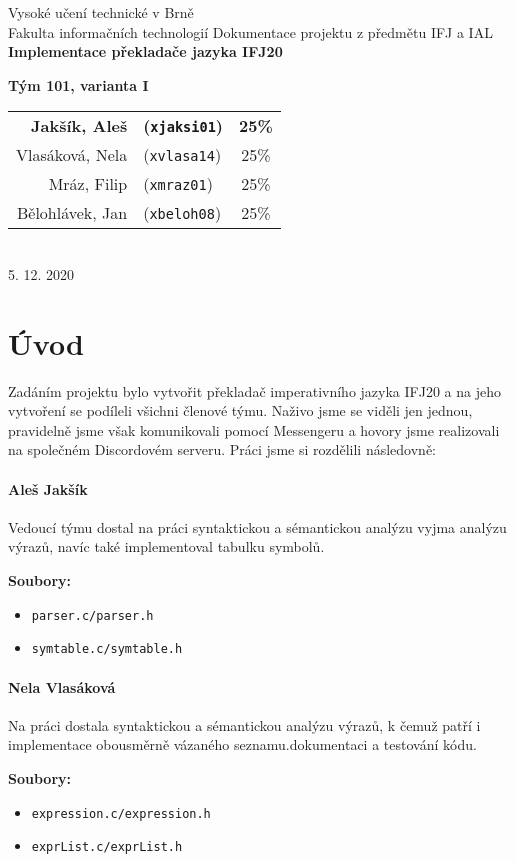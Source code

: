 \documentclass[czech,a4paper,12pt]{article}[]
\begin{document}
\begin{center}
\LARGE{Vysoké učení technické v Brně \\
Fakulta informačních technologií}
\vfill 
\LARGE{Dokumentace projektu z předmětu IFJ a IAL}\\
\Huge{\textbf{Implementace překladače jazyka IFJ20}}\\
\vfill
\large{\textbf{Tým 101, varianta I}\\
\begin{tabular}{ r l c}
\textbf{Jakšík, Aleš} & \textbf{(\texttt{xjaksi01})} & \textbf{25\%} \\ 
Vlasáková, Nela & (\texttt{xvlasa14}) & 25\% \\  
Mráz, Filip & (\texttt{xmraz01}) & 25\% \\
Bělohlávek, Jan & (\texttt{xbeloh08}) & 25\% 
\end{tabular}
}\\[3em]
5. 12. 2020
\end{center}

\newpage

\tableofcontents

\newpage

\section{Úvod}
Zadáním projektu bylo vytvořit překladač imperativního jazyka IFJ20 a na jeho vytvoření se podíleli všichni členové týmu. Naživo jsme se viděli jen jednou, pravidelně jsme však komunikovali pomocí Messengeru a hovory jsme realizovali na společném Discordovém serveru. Práci jsme si rozdělili následovně:

\paragraph{Aleš Jakšík}
\begin{inpar}
Vedoucí týmu dostal na práci syntaktickou a sémantickou analýzu vyjma analýzu výrazů, navíc také implementoval tabulku symbolů.

\medskip
\textbf{Soubory:}
    \begin{itemize}
    \item \texttt{parser.c/parser.h}
    \item \texttt{symtable.c/symtable.h}
\end{itemize}
\end{inpar}

\paragraph{Nela Vlasáková}
\begin{inpar}
Na práci dostala syntaktickou a sémantickou analýzu výrazů, k čemuž patří i implementace obousměrně vázaného seznamu.dokumentaci a testování kódu.

\medskip
\textbf{Soubory:}
\begin{itemize}
    \item \texttt{expression.c/expression.h}
    \item \texttt{exprList.c/exprList.h}
\end{itemize}
\end{inpar}    
\end{document}
